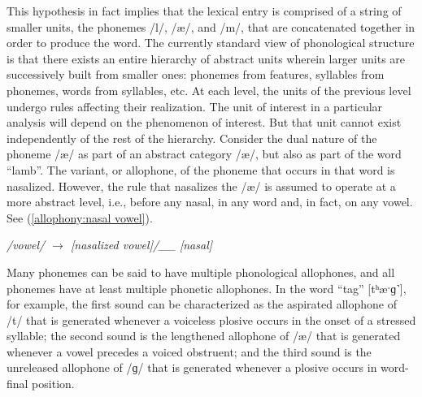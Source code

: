 This hypothesis in fact implies that the lexical entry is comprised
of a string of smaller units, the phonemes {/l/}, {/æ/},
and {/m/}, that are concatenated together in order to produce
the word. The currently standard view of phonological structure is
that there exists an entire hierarchy of abstract units wherein larger
units are successively built from smaller ones: phonemes from features,
syllables from phonemes, words from syllables, etc. At each level,
the units of the previous level undergo rules affecting their realization.
The unit of interest in a particular analysis will depend on the phenomenon
of interest. But that unit cannot exist independently of the rest
of the hierarchy. Consider the dual nature of the phoneme {/æ/}
as part of an abstract category {/æ/}, but also as part
of the word “lamb”. The variant, or allophone, of the phoneme
that occurs in that word is nasalized. However, the rule that nasalizes
the {/æ/} is assumed to operate at a more abstract level,
i.e., before any nasal, in any word and, in fact, on any
vowel. See (\ref{allophony:nasal vowel}). 
\begin{covexample}
\emph{\label{allophony:nasal vowel}/vowel/ $\rightarrow$ {[}nasalized
vowel{]}/\_\_ {[}nasal{]}}
\end{covexample}
Many phonemes can be said to have multiple phonological allophones,
and all phonemes have at least multiple phonetic allophones. In the
word “tag” {[tʰæˑɡ˺}{]}, for example, the first
sound can be characterized as the aspirated allophone of {/t/}
that is generated whenever a voiceless plosive occurs in the onset
of a stressed syllable; the second sound is the lengthened allophone
of {/æ/} that is generated whenever a vowel precedes a voiced
obstruent; and the third sound is the unreleased allophone of {/ɡ/}
that is generated whenever a plosive occurs in word-final position. 

